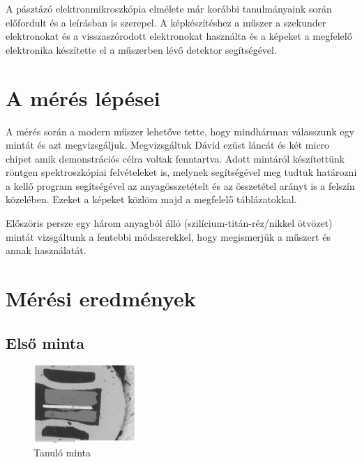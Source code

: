 \documentclass[a4paper,12pt]{article}
\begin{document}
\par A pásztázó elektronmikroszkópia elmélete már korábbi tanulmányaink során előfordult és a leírásban
is szerepel. A képkészítéshez a műszer a szekunder elektronokat és a visszaszórodott elektronokat használta
és a képeket a megfelelő elektronika készítette el a műszerben lévő detektor segítségével.

\section{ A mérés lépései}

\par A mérés során a modern műszer lehetőve tette, hogy mindhárman válasszunk egy mintát és azt megvizsgáljuk.
Megvizsgáltuk Dávid ezüst láncát és két micro chipet amik demonstrációs célra voltak fenntartva. Adott mintáról
készítettünk röntgen spektroszkópiai felvételeket is, melynek segítségével meg tudtuk határozni a kellő program
segítségével az anyagösszetételt és az összetétel arányt is a felszín közelében. Ezeket a képeket közlöm majd a
megfelelő táblázatokkal.

\par Előszöris persze egy három anyagból álló (szilícium-titán-réz/nikkel ötvözet) mintát vizsgáltunk a fentebbi
módszerekkel, hogy megismerjük a műszert és annak használatát.

\vfill

\newpage

\section{ Mérési eredmények}

\subsection{ Első minta}

\begin{figure}[H]
	\centering
	\includegraphics[width=0.35\textwidth, height=0.25\textwidth]{Jcsop/elso.png}
	\caption{Tanuló minta}
\end{figure}
\end{document}
